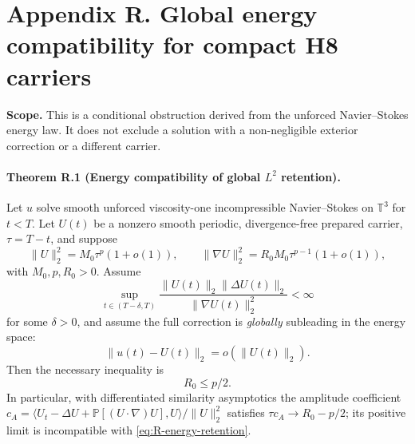 \clearpage
\section*{Appendix R. Global energy compatibility for compact H8 carriers}
\noindent\textbf{Scope.} This is a conditional obstruction derived from the
unforced Navier--Stokes energy law. It does not exclude a solution with a
non-negligible exterior correction or a different carrier.

\paragraph{Theorem R.1 (Energy compatibility of global $L^2$ retention).}
Let $u$ solve smooth unforced viscosity-one incompressible Navier--Stokes
on $\mathbb T^3$ for $t<T$. Let $U(t)$ be a nonzero smooth periodic,
divergence-free prepared carrier, $\tau=T-t$, and suppose
\begin{equation}\label{eq:R-energy-profiles}
 \|U\|_2^2=M_0\tau^p(1+o(1)),\qquad
 \|\nabla U\|_2^2=R_0M_0\tau^{p-1}(1+o(1)),
\end{equation}
with $M_0,p,R_0>0$. Assume
\begin{equation}\label{eq:R-laplacian-ratio}
 \sup_{t\in(T-\delta,T)}
 \frac{\|U(t)\|_2\|\Delta U(t)\|_2}
      {\|\nabla U(t)\|_2^2}<\infty
\end{equation}
for some $\delta>0$, and assume the full correction is
\emph{globally} subleading in the energy space:
\begin{equation}\label{eq:R-energy-retention}
 \|u(t)-U(t)\|_2=o(\|U(t)\|_2).
\end{equation}
Then the necessary inequality is
\begin{equation}\label{eq:R-energy-necessary}
 \boxed{R_0\le p/2.}
\end{equation}
In particular, with differentiated similarity asymptotics the
amplitude coefficient
$c_A=\langle U_t-\Delta U+\mathbb P[(U\cdot\nabla)U],U\rangle/
\|U\|_2^2$ satisfies
$\tau c_A\to R_0-p/2$; its positive limit is incompatible
with \eqref{eq:R-energy-retention}.

